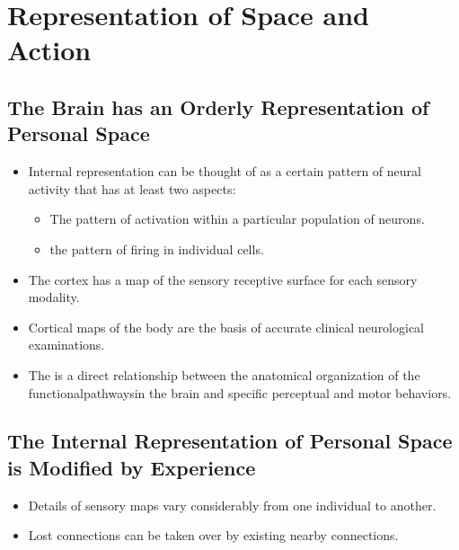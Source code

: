 \documentclass[12pt,a4paper]{article}
\begin{document}
\clearpage
\section{Representation of Space and Action}
\subsection{The Brain has an Orderly Representation of Personal Space}
\begin{itemize}
    \item Internal representation can be thought of as a certain pattern of neural activity that has at least two aspects:
        \begin{itemize}
            \item The pattern of activation within a particular population of neurons.
            \item the pattern of firing in individual cells.
        \end{itemize}
    \item The cortex has a map of the sensory receptive surface for each sensory modality.
    \item Cortical maps of the body are the basis of accurate clinical neurological examinations.
    \item The is a direct relationship between the anatomical organization of the functionalpathwaysin the brain and specific perceptual and motor behaviors.
\end{itemize}

\subsection{The Internal Representation of Personal Space is Modified by Experience}
\begin{itemize}
    \item Details of sensory maps vary considerably from one individual to another.
    \item Lost connections can be taken over by existing nearby connections.
\end{itemize}
\end{document}
